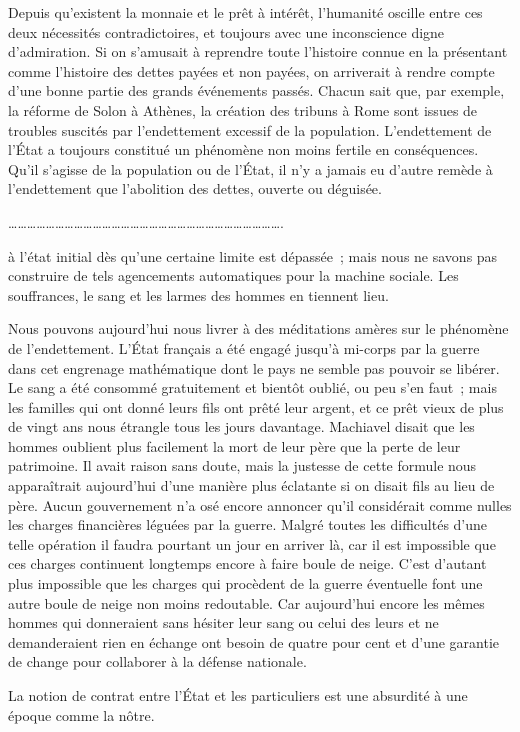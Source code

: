 \documentclass[french,twoside]{book} %
\begin{document}
Depuis qu'existent la monnaie et le prêt à intérêt, l'humanité oscille entre ces deux nécessités contradictoires, et toujours avec une inconscience digne d'admiration. Si on s'amusait à reprendre toute l'histoire connue en la présentant comme l'histoire des dettes payées et non payées, on arriverait à rendre compte d'une bonne partie des grands événements passés. Chacun sait que, par exemple, la réforme de Solon à Athènes, la création des tribuns à Rome sont issues de troubles suscités par l'endettement excessif de la population. L'endettement de l'État a toujours constitué un phénomène non moins fertile en conséquences. Qu'il s'agisse de la population ou de l'État, il n'y a jamais eu d'autre remède à l'endettement que l'abolition des dettes, ouverte ou déguisée.\par

\begin{center}
\noindent \centerline{…………………………………………………………………………….}\par
\end{center}

 à l'état initial dès qu'une certaine limite est dépassée ; mais nous ne savons pas construire de tels agencements automatiques pour la machine sociale. Les souffrances, le sang et les larmes des hommes en tiennent lieu.\par
Nous pouvons aujourd'hui nous livrer à des méditations amères sur le phénomène de l'endettement. L'État français a été engagé jusqu'à mi-corps par la guerre dans cet engrenage mathématique dont le pays ne semble pas pouvoir se libérer. Le sang a été consommé gratuitement et bientôt oublié, ou peu s'en faut ; mais les familles qui ont donné leurs fils ont prêté leur argent, et ce prêt vieux de plus de vingt ans nous étrangle tous les jours davantage. Machiavel disait que les hommes oublient plus facilement la mort de leur père que la perte de leur patrimoine. Il avait raison sans doute, mais la justesse de cette formule nous apparaîtrait aujourd'hui d'une manière plus éclatante si on disait fils au lieu de père. Aucun gouvernement n'a osé encore annoncer qu'il considérait comme nulles les charges financières léguées par la guerre. Malgré toutes les difficultés d'une telle opération il faudra pourtant un jour en arriver là, car il est impossible que ces charges continuent longtemps encore à faire boule de neige. C'est d'autant plus impossible que les charges qui procèdent de la guerre éventuelle font une autre boule de neige non moins redoutable. Car aujourd'hui encore les mêmes hommes qui donneraient sans hésiter leur sang ou celui des leurs et ne demanderaient rien en échange ont besoin de quatre pour cent et d'une garantie de change pour collaborer à la défense nationale.\par
La notion de contrat entre l'État et les particuliers est une absurdité à une époque comme la nôtre.\par
\end{document}
